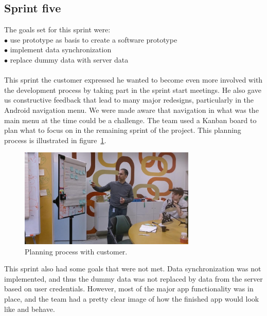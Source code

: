\subsection{Sprint five}
The goals set for this sprint were:\\
$\bullet$\hspace{0.25cm} use prototype as basis to create a software prototype\\
$\bullet$\hspace{0.25cm} implement data synchronization\\
$\bullet$\hspace{0.25cm} replace dummy data with server data\\\\
This sprint the customer expressed he wanted to become even more involved with the development process by taking part in the sprint start meetings.
He also gave us constructive feedback that lead to many major redesigns, particularly in the Android navigation menu. We were made aware that navigation in what was the main menu at the time could be a challenge. The team used a Kanban board to plan what to focus on in the remaining sprint of the project. This planning process is illustrated in figure~\ref{fig:kanban}.

\begin{figure}[htp]
\centering
\includegraphics[width=0.75\textwidth, clip, trim=5cm 0cm 0cm 0cm]{ch/devProcess/fig/kanban.jpg}
\caption{Planning process with customer.}
\label{fig:kanban}
\end{figure}

\noindent This sprint also had some goals that were not met. Data synchronization was not implemented, and thus the dummy data was not replaced by data from the server based on user credentials. However, most of the major app functionality was in place, and the team had a pretty clear image of how the finished app would look like and behave.

